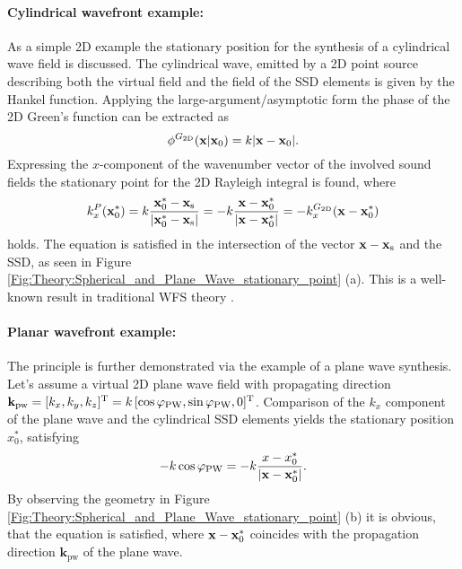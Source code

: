 \paragraph{Cylindrical wavefront example: \\}
As a simple 2D example the stationary position for the synthesis of a cylindrical wave field is discussed.
The cylindrical wave, emitted by a 2D point source describing both the virtual field and the field of the SSD elements is given by the Hankel function.
Applying the large-argument/asymptotic form \cite{Williams1999} the phase of the 2D Green's function can be extracted as
\begin{equation}
\phi^{G_{2\mathrm{D}}}(\mathbf{x}|\mathbf{x}_0) = k |\mathbf{x} - \mathbf{x}_0|.
\end{equation}
Expressing the $x$-component of the wavenumber vector of the involved sound fields the stationary point for the 2D Rayleigh integral is found, where
\begin{equation}
k_{x}^P(\mathbf{x}_0^*) = k \frac{\mathbf{x}_0^*-\mathbf{x}_{\mathrm{s}}}{|\mathbf{x}_0^*-\mathbf{x}_{\mathrm{s}}|} = - k \frac{\mathbf{x}-\mathbf{x}_0^*}{|\mathbf{x}-\mathbf{x}_0^*|} = - k_{x}^{G_{2\mathrm{D}}}( \mathbf{x} - \mathbf{x}_0^* )
\end{equation}
holds.
The equation is satisfied in the intersection of the vector $ \mathbf{x} - \mathbf{x}_{\mathrm{s}} $ and the SSD, as seen in Figure \ref{Fig:Theory:Spherical_and_Plane_Wave_stationary_point} (a).
This is a well-known result in traditional WFS theory \cite{Start1997:phd,Verheijen1997:phd}.
%

\paragraph{Planar wavefront example: \\}
The principle is further demonstrated via the example of a plane wave synthesis.
Let's assume a virtual 2D plane wave field with propagating direction $\mathbf{k}_\text{pw}=[k_x,k_y,k_z]^{\mathrm{T}}=k\,[\cos\varphi_\text{PW},\sin\varphi_\text{PW},0]^{\mathrm{T}}$.
Comparison of the $k_x$ component of the plane wave and the cylindrical SSD elements yields the stationary position $x_0^*$, satisfying
\begin{equation}
\label{Eq:Phix0_PlaneWaveExample}
- k \cos\varphi_\text{PW} = -k \frac{x-x_0^*}{|\mathbf{x} - \mathbf{x}_0^*|}.
\end{equation}
By observing the geometry in Figure \ref{Fig:Theory:Spherical_and_Plane_Wave_stationary_point} (b) it is obvious, that the equation is satisfied, where $\mathbf{x}-\mathbf{x}_0^*$ coincides with the propagation direction $\mathbf{k}_\text{pw}$ of the plane wave.


